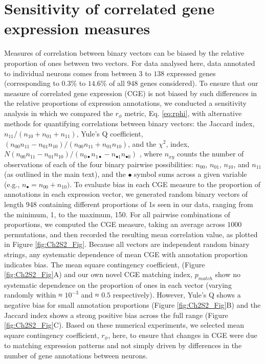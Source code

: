 \section{Sensitivity of correlated gene expression measures}
\label{app:AppendixCh2_2}
Measures of correlation between binary vectors can be biased by the relative proportion of ones
between two vectors. For data analysed here, data annotated to individual neurons comes from between $3$ to
$138$ expressed genes (corresponding to $0.3\%$ to $14.6\%$ of all $948$ genes considered). To ensure that our measure of correlated gene expression (CGE) is not biased by such differences in the relative proportions of expression annotations, we conducted a sensitivity analysis in which we compared the $r_\phi$ metric, Eq. \ref{eq:rphi}, with alternative
methods for quantifying correlations between binary vectors: the Jaccard index, $n_{11}/(n_{10}+n_{01}+n_{11})$, Yule's Q
coefficient, $(n_{00}n_{11}-n_{01}n_{10})/(n_{00}n_{11}+n_{01}n_{10})$, and the $\chi{^2}$, index, $N(n_{00}n_{11}-n_{01}n_{10})/(n_{0\bullet}n_{1\bullet}-n_{\bullet1}n_{\bullet0})$ \citep{Kaufman2006}, where $n_{xy}$ counts
the number of observations of each of the four binary pairwise possibilities: $n_{00}$, $n_{01}$, $n_{10}$, and $n_{11}$ (as outlined in
the main text), and the $\bullet$ symbol sums across a given variable (e.g., $n_{\bullet}= n_{00} + n_{10})$.
To evaluate bias in each CGE measure to the proportion of annotations in each expression vector, we
generated random binary vectors of length 948 containing different proportions of 1s seen in our data, ranging
from the minimum, 1, to the maximum, 150. For all pairwise combinations of proportions, we computed the CGE
measure, taking an average across $1 000$ permutations, and then recorded the resulting mean correlation value,
as plotted in Figure \ref{fig:Ch2S2_Fig}. Because all vectors are independent random binary strings, any systematic dependence of
mean CGE with annotation proportion indicates bias. The mean square contingency coefficient, (Figure \ref{fig:Ch2S2_Fig}A) and
our own novel CGE matching index, $p_{match}$ show no systematic dependence on the proportion of ones in
each vector (varying randomly within ≈ $10^{-3}$ and ≈ $0.5$ respectively). However, Yule's Q shows a negative bias for
small annotation proportions (Figure \ref{fig:Ch2S2_Fig}B) and the Jaccard index shows a strong positive bias across the full range (Figure \ref{fig:Ch2S2_Fig}C). Based on these numerical experiments, we selected mean square contingency coefficient, $r_\phi$, here, to
ensure that changes in CGE were due to matching expression patterns and not simply driven by differences in the
number of gene annotations between neurons.


